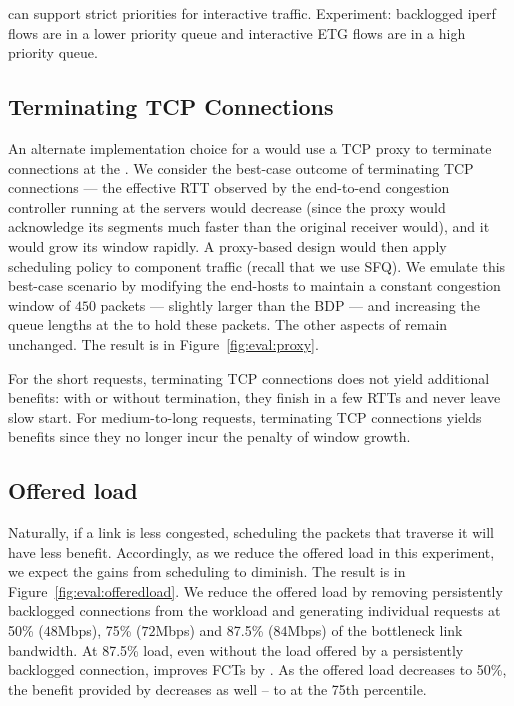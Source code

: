 
\begin{outline}
    \1 \name can support strict priorities for interactive traffic.
    \1 Experiment: backlogged iperf flows are in a lower priority queue and interactive ETG flows are in a high priority queue.
\end{outline}


\subsection{Terminating TCP Connections}\label{s:eval:proxy}
An alternate implementation choice for a \name would use a TCP proxy to terminate connections at the \inbox. 
We consider the best-case outcome of terminating TCP connections --- the effective RTT observed by the end-to-end congestion controller running at the servers would decrease (since the proxy would acknowledge its segments much faster than the original receiver would), and it would grow its window rapidly.
A proxy-based design would then apply scheduling policy to component traffic (recall that we use SFQ).
We emulate this best-case scenario by modifying the end-hosts to maintain a constant congestion window of $450$ packets --- slightly larger than the BDP --- and increasing the queue lengths at the \inbox to hold these packets. The other aspects of \name remain unchanged.
The result is in Figure~\ref{fig:eval:proxy}.
%

%
For the short requests, terminating TCP connections does not yield additional benefits: with or without termination, they finish in a few RTTs and never leave slow start.
For medium-to-long requests, terminating TCP connections yields benefits since they no longer incur the penalty of window growth.



\subsection{Offered load}\label{s:eval:offeredload}
Naturally, if a link is less congested, scheduling the packets that traverse it will have less benefit. Accordingly, as we reduce the offered load in this experiment, we expect the gains from scheduling to diminish. The result is in Figure~\ref{fig:eval:offeredload}. We reduce the offered load by removing persistently backlogged connections from the workload and generating individual requests at 50\% ($48$Mbps), 75\% ($72$Mbps) and 87.5\% ($84$Mbps) of the bottleneck link bandwidth.
At 87.5\% load, even without the load offered by a persistently backlogged connection, \name improves FCTs by . 
As the offered load decreases to 50\%, the benefit provided by \name decreases as well -- to  at the 75th percentile.

